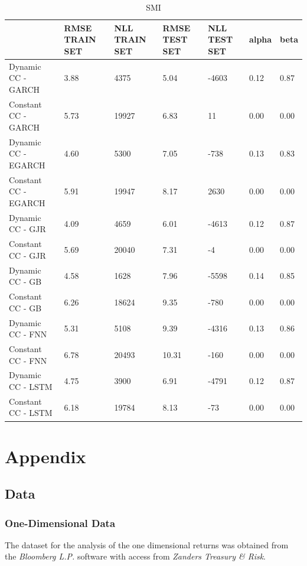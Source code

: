 \documentclass[a4paper, oneside]{discothesis}
\begin{document}
\begin{table}[!ht]
    \centering
    \scriptsize
    \begin{tabular}{|p{3.5cm}||p{1.1cm}|p{1.1cm}|p{1.1cm}|p{1.1cm}|p{1.1cm}|p{1.1cm}|}
    \hline
         & RMSE TRAIN SET & NLL TRAIN SET & RMSE TEST SET & NLL TEST SET & alpha & beta \\ \hline
        Dynamic CC - GARCH & 3.88 & 4375 & 5.04 & -4603 & 0.12 & 0.87 \\ \hline
        Constant CC - GARCH & 5.73 & 19927 & 6.83 & 11 & 0.00 & 0.00 \\ \hline
        Dynamic CC - EGARCH & 4.60 & 5300 & 7.05 & -738 & 0.13 & 0.83 \\ \hline
        Constant CC - EGARCH & 5.91 & 19947 & 8.17 & 2630 & 0.00 & 0.00 \\ \hline
        Dynamic CC - GJR & 4.09 & 4659 & 6.01 & -4613 & 0.12 & 0.87 \\ \hline
        Constant CC - GJR & 5.69 & 20040 & 7.31 & -4 & 0.00 & 0.00 \\ \hline
        Dynamic CC - GB & 4.58 & 1628 & 7.96 & -5598 & 0.14 & 0.85 \\ \hline
        Constant CC - GB & 6.26 & 18624 & 9.35 & -780 & 0.00 & 0.00 \\ \hline
        Dynamic CC - FNN & 5.31 & 5108 & 9.39 & -4316 & 0.13 & 0.86 \\ \hline
        Constant CC - FNN & 6.78 & 20493 & 10.31 & -160 & 0.00 & 0.00 \\ \hline
        Dynamic CC - LSTM & 4.75 & 3900 & 6.91 & -4791 & 0.12 & 0.87 \\ \hline
        Constant CC - LSTM & 6.18 & 19784 & 8.13 & -73 & 0.00 & 0.00 \\ \hline
    \end{tabular}
    \normalsize
    \caption{SMI}
\end{table}
\chapter{Appendix}
\section{Data}
\subsection{One-Dimensional Data} \label{ssec:1d_data}
The dataset for the analysis of the one dimensional returns was obtained from the \textit{Bloomberg L.P.} software with access from \textit{Zanders Treasury \& Risk}.
\end{document}
